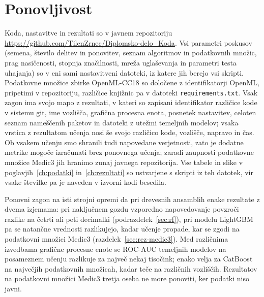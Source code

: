 \documentclass[a4paper,12pt,openright]{book}
\begin{document}
\section{Ponovljivost}
\label{sec:ponovljivost}

Koda, nastavitve in rezultati so v javnem repozitoriju
\url{https://github.com/TilenZrnec/Diplomsko-delo_Koda}. Vsi parametri
poskusov (semena, število delitev in ponovitev, seznam algoritmov in
podatkovnih množic, prag nasičenosti, stopnja značilnosti, mreža uglaševanja in
parametri testa uhajanja) so v eni sami nastavitveni datoteki, iz katere jih
berejo vsi skripti. Podatkovne množice zbirke OpenML-CC18 so določene z
identifikatorji OpenML, pripetimi v repozitoriju, različice knjižnic pa v
datoteki \texttt{requirements.txt}. Vsak zagon ima svojo mapo z rezultati, v
kateri so zapisani identifikator različice kode v sistemu git, ime vozlišča,
grafična procesna enota, posnetek nastavitev, celoten seznam nameščenih paketov in
datoteki z utežmi temeljnih modelov; vsaka vrstica z rezultatom učenja nosi še
svojo različico kode, vozlišče, napravo in čas. Ob vsakem učenju smo shranili
tudi napovedane verjetnosti, zato je dodatne metrike mogoče izračunati brez
ponovnega učenja; zaradi zaupnosti podatkovne množice Medic3 jih hranimo
zunaj javnega repozitorija. Vse tabele in slike v poglavjih~\ref{ch:podatki}
in~\ref{ch:rezultati} so ustvarjene s skripti iz teh datotek, vir vsake
številke pa je naveden v izvorni kodi besedila.

Ponovni zagon na isti strojni opremi da pri drevesnih ansamblih enake
rezultate z dvema izjemama: pri naključnem gozdu vzporedno napovedovanje
povzroči razlike na četrti ali peti decimalki (podrazdelek~\ref{sec:rf}), pri
modelu LightGBM pa se natančne vrednosti razlikujejo, kadar učenje propade, kar
se zgodi na podatkovni množici Medic3 (razdelek~\ref{sec:rez-medic3}). Med
različnima izvedbama grafične procesne enote se ROC-AUC temeljnih modelov na
posameznem učenju razlikuje za največ nekaj tisočink; enako velja za CatBoost
na največjih podatkovnih množicah, kadar teče na različnih vozliščih. Rezultatov na
podatkovni množici Medic3 tretja oseba ne more ponoviti, ker podatki niso
javni.
\end{document}
